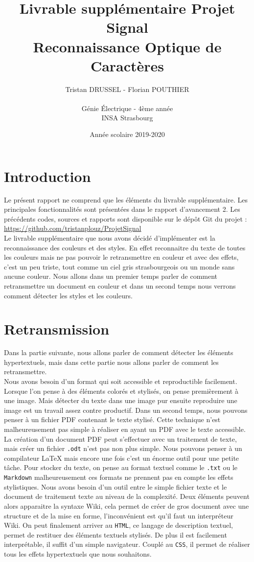 \documentclass[a4paper,12pt,titlepage]{report}
\title{Livrable supplémentaire Projet Signal\\Reconnaissance Optique de Caractères}
\author{Tristan DRUSSEL - Florian POUTHIER \\ \\ Génie Électrique - 4ème année\\ INSA Strasbourg}
\date{Année scolaire 2019-2020}
\begin{document}
	\begin{titlepage}
		\maketitle
	\end{titlepage}
	\tableofcontents
	\newpage
	\section{Introduction}
	Le présent rapport ne comprend que les éléments du livrable supplémentaire. Les principales fonctionnalités sont présentées dans le rapport d'avancement 2. Les précédents codes, sources et rapports sont disponible sur le dépôt Git du projet : \url{https://github.com/tristanplouz/ProjetSignal} \\
	Le livrable supplémentaire que nous avons décidé d'implémenter est la reconnaissance des couleurs et des styles. En effet reconnaitre du texte de toutes les couleurs mais ne pas pouvoir le retransmettre en couleur et avec des effets, c'est un peu triste, tout comme un ciel gris strasbourgeois ou un monde sans aucune couleur.
	Nous allons dans un premier temps parler de comment retransmettre un document en couleur et dans un second temps nous verrons comment détecter les styles et les couleurs.
	\section{Retransmission}
	Dans la partie suivante, nous allons parler de comment détecter les éléments hypertextuels, mais dans cette partie nous allons parler de comment les retransmettre.\\
	Nous avons besoin d'un format qui soit accessible et reproductible facilement. Lorsque l'on pense à des éléments colorés et stylisés, on pense premièrement à une image. Mais détecter du texte dans une image pur ensuite reproduire une image est un travail assez contre productif. Dans un second temps, nous pouvons penser à un fichier PDF contenant le texte stylisé. Cette technique n'est malheureusement pas simple à réaliser en ayant un PDF avec le texte accessible. La création d'un document PDF peut s'effectuer avec un traitement de texte, mais créer un fichier \texttt{.odt} n'est pas non plus simple. Nous pouvons penser à un compilateur \LaTeX{} mais encore une fois c'est un énorme outil pour une petite tâche. Pour stocker du texte, on pense au format textuel comme le \texttt{.txt} ou le \texttt{Markdown} malheureusement ces formats ne prennent pas en compte les effets stylistiques. Nous avons besoin d'un outil entre le simple fichier texte et le document de traitement texte au niveau de la complexité. Deux éléments peuvent alors apparaitre la syntaxe Wiki, cela permet de créer de gros document avec une structure et de la mise en forme, l'inconvénient est qu'il faut un interpréteur Wiki. On peut finalement arriver au \texttt{HTML}, ce langage de description textuel, permet de restituer des éléments textuels stylisés. De plus il est facilement interprétable, il suffit d'un simple navigateur. Couplé au \texttt{CSS}, il permet de réaliser tous les effets hypertextuels que nous souhaitons.
\end{document}
